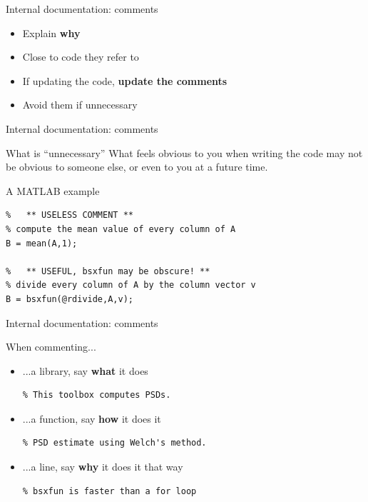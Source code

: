 \documentclass[10pt]{beamer}
\begin{document}
\begin{frame}{Internal documentation: comments} %
	\large
	\begin{itemize}
		\item Explain \textbf{why}
		\item Close to code they refer to
		\item If updating the code, \textbf{update the comments}
		\item Avoid them if unnecessary
	\end{itemize}

\end{frame}

\begin{frame}[fragile]{Internal documentation: comments} %

	\begin{block}{What is ``unnecessary''}
		What feels obvious to you when writing the code may not be
		obvious to someone else, or even to you at a future time.
	\end{block}

	\begin{block}{A MATLAB example}
\begin{verbatim}
%   ** USELESS COMMENT **
% compute the mean value of every column of A
B = mean(A,1);

%   ** USEFUL, bsxfun may be obscure! **
% divide every column of A by the column vector v
B = bsxfun(@rdivide,A,v);
\end{verbatim}
	\end{block}

\end{frame}

\begin{frame}[fragile]{Internal documentation: comments} %
	\large
	\begin{block}{When commenting...}
		\begin{itemize}
			\item ...a library, say \alert{\textbf{what}} it does
\begin{verbatim}
% This toolbox computes PSDs.
\end{verbatim}
			\item ...a function, say \alert{\textbf{how}} it does it
\begin{verbatim}
% PSD estimate using Welch's method.
\end{verbatim}
			\item ...a line, say \alert{\textbf{why}} it does it that way
\begin{verbatim}
% bsxfun is faster than a for loop
\end{verbatim}
		\end{itemize}
	\end{block}
\end{frame}
\end{document}
